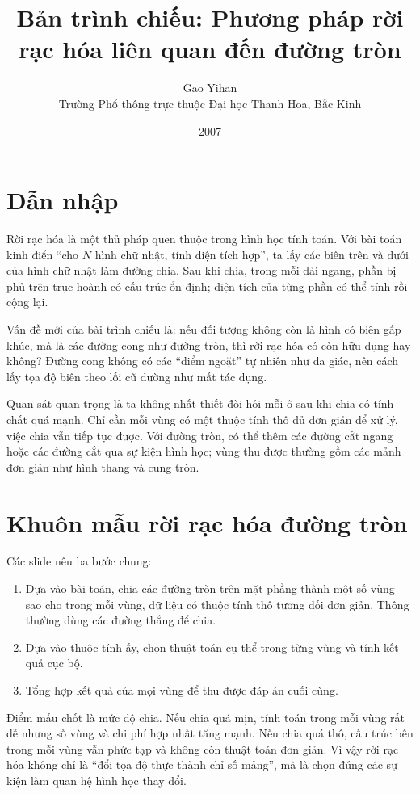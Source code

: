 \documentclass[11pt]{article}
\title{Bản trình chiếu: Phương pháp rời rạc hóa liên quan đến đường tròn}
\author{Gao Yihan\\Trường Phổ thông trực thuộc Đại học Thanh Hoa, Bắc Kinh}
\date{2007}
\begin{document}
\maketitle


\section{Dẫn nhập}

Rời rạc hóa là một thủ pháp quen thuộc trong hình học tính toán. Với bài toán
kinh điển ``cho \(N\) hình chữ nhật, tính diện tích hợp'', ta lấy các biên
trên và dưới của hình chữ nhật làm đường chia. Sau khi chia, trong mỗi dải
ngang, phần bị phủ trên trục hoành có cấu trúc ổn định; diện tích của từng
phần có thể tính rồi cộng lại.

Vấn đề mới của bài trình chiếu là: nếu đối tượng không còn là hình có biên gấp
khúc, mà là các đường cong như đường tròn, thì rời rạc hóa có còn hữu dụng hay
không? Đường cong không có các ``điểm ngoặt'' tự nhiên như đa giác, nên cách
lấy tọa độ biên theo lối cũ dường như mất tác dụng.

Quan sát quan trọng là ta không nhất thiết đòi hỏi mỗi ô sau khi chia có tính
chất quá mạnh. Chỉ cần mỗi vùng có một thuộc tính thô đủ đơn giản để xử lý,
việc chia vẫn tiếp tục được. Với đường tròn, có thể thêm các đường cắt ngang
hoặc các đường cắt qua sự kiện hình học; vùng thu được thường gồm các mảnh
đơn giản như hình thang và cung tròn.

\section{Khuôn mẫu rời rạc hóa đường tròn}

Các slide nêu ba bước chung:
\begin{enumerate}
  \item Dựa vào bài toán, chia các đường tròn trên mặt phẳng thành một số vùng
  sao cho trong mỗi vùng, dữ liệu có thuộc tính thô tương đối đơn giản. Thông
  thường dùng các đường thẳng để chia.
  \item Dựa vào thuộc tính ấy, chọn thuật toán cụ thể trong từng vùng và tính
  kết quả cục bộ.
  \item Tổng hợp kết quả của mọi vùng để thu được đáp án cuối cùng.
\end{enumerate}

Điểm mấu chốt là mức độ chia. Nếu chia quá mịn, tính toán trong mỗi vùng rất
dễ nhưng số vùng và chi phí hợp nhất tăng mạnh. Nếu chia quá thô, cấu trúc bên
trong mỗi vùng vẫn phức tạp và không còn thuật toán đơn giản. Vì vậy rời rạc
hóa không chỉ là ``đổi tọa độ thực thành chỉ số mảng'', mà là chọn đúng các sự
kiện làm quan hệ hình học thay đổi.
\end{document}
